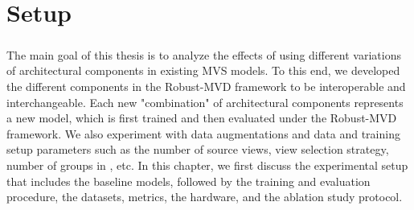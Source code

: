 \chapter{Setup}\label{chap:approach}
\paragraph{}The main goal of this thesis is to analyze the effects of using different variations of architectural components in existing MVS models. To this end, we developed the different components in the Robust-MVD framework to be interoperable and interchangeable. Each new "combination" of architectural components represents a new model, which is first trained and then evaluated under the Robust-MVD framework. We also experiment with data augmentations and data and training setup parameters such as the number of source views, view selection strategy, number of groups in {\gwc}, etc. In this chapter, we first discuss the experimental setup that includes the baseline models, followed by the training and evaluation procedure, the datasets, metrics, the hardware, and the ablation study protocol. 


 
